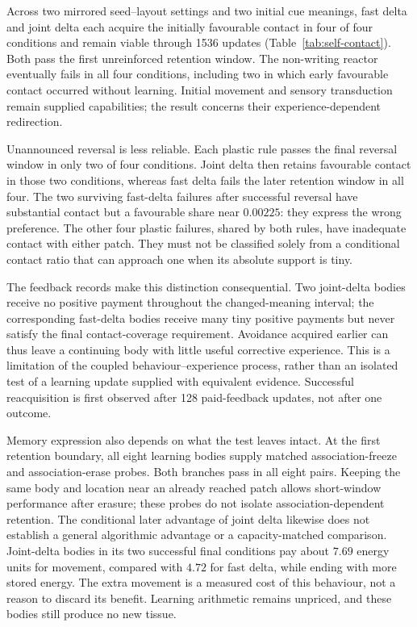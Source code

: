Across two mirrored seed--layout settings and two initial cue meanings, fast delta and joint delta each acquire the initially favourable contact in four of four conditions and remain viable through 1536 updates (Table~\ref{tab:self-contact}). Both pass the first unreinforced retention window. The non-writing reactor eventually fails in all four conditions, including two in which early favourable contact occurred without learning. Initial movement and sensory transduction remain supplied capabilities; the result concerns their experience-dependent redirection.

Unannounced reversal is less reliable. Each plastic rule passes the final reversal window in only two of four conditions. Joint delta then retains favourable contact in those two conditions, whereas fast delta fails the later retention window in all four. The two surviving fast-delta failures after successful reversal have substantial contact but a favourable share near $0.00225$: they express the wrong preference. The other four plastic failures, shared by both rules, have inadequate contact with either patch. They must not be classified solely from a conditional contact ratio that can approach one when its absolute support is tiny.

The feedback records make this distinction consequential. Two joint-delta bodies receive no positive payment throughout the changed-meaning interval; the corresponding fast-delta bodies receive many tiny positive payments but never satisfy the final contact-coverage requirement. Avoidance acquired earlier can thus leave a continuing body with little useful corrective experience. This is a limitation of the coupled behaviour--experience process, rather than an isolated test of a learning update supplied with equivalent evidence. Successful reacquisition is first observed after 128 paid-feedback updates, not after one outcome.

Memory expression also depends on what the test leaves intact. At the first retention boundary, all eight learning bodies supply matched association-freeze and association-erase probes. Both branches pass in all eight pairs. Keeping the same body and location near an already reached patch allows short-window performance after erasure; these probes do not isolate association-dependent retention. The conditional later advantage of joint delta likewise does not establish a general algorithmic advantage or a capacity-matched comparison. Joint-delta bodies in its two successful final conditions pay about $7.69$ energy units for movement, compared with $4.72$ for fast delta, while ending with more stored energy. The extra movement is a measured cost of this behaviour, not a reason to discard its benefit. Learning arithmetic remains unpriced, and these bodies still produce no new tissue.

